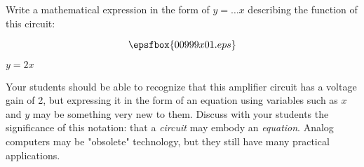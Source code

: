 

Write a mathematical expression in the form of $y = \dots x$ describing the function of this circuit:

$$\epsfbox{00999x01.eps}$$







$y = 2x$







Your students should be able to recognize that this amplifier circuit has a voltage gain of 2, but expressing it in the form of an equation using variables such as $x$ and $y$ may be something very new to them.  Discuss with your students the significance of this notation: that a {\it circuit} may embody an {\it equation}.  Analog computers may be "obsolete" technology, but they still have many practical applications.



